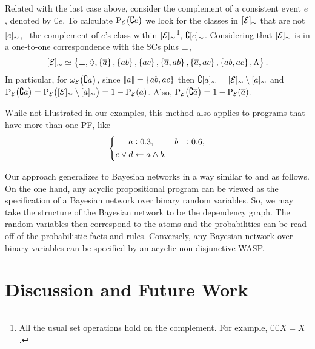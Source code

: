 \documentclass[x11names]{tlp}
\renewcommand{\cite}{\citep}
\begin{document}
\begin{example}
	Related with the last case above, consider the complement of a consistent event $e$, denoted by $\complement e$.
	To calculate $\prE\at{\complement e}$ we look for the classes in $[{{\mathcal{E}}}]_{\sim}$ that are not $[{e}]_{\sim}$, \ie~the complement of $e$'s class within $[{{\mathcal{E}}}]_{\sim}$\footnote{All the usual set operations hold on the complement.
	For example, $\complement\complement X = X$.}, $\complement[{e}]_{\sim}$.
	Considering that $[{{\mathcal{E}}}]_{\sim}$ is in a one-to-one correspondence with the \aclp{SC} plus $\bot$, 
	\begin{equation*}
		[{{\mathcal{E}}}]_{\sim} \simeq \set{
			\bot, \ensuremath{\Diamond}, \set{\ensuremath{\overline{a}}}
			, \set{ab}, \set{ac}, \set{\ensuremath{\overline{a}}, ab}
			, \set{\ensuremath{\overline{a}}, ac}, \set{ab, ac}, \ensuremath{\Lambda}}.
	\end{equation*}
	In particular, for $\wgtE\at{\complement a}$, since $\left\llbracket a \right\rrbracket = \set{ab, ac}$ then $\complement [{a}]_{\sim} = [{{\mathcal{E}}}]_{\sim} \setminus [{a}]_{\sim}$ and
	\(
	\prE\at{\complement a} =  \prE\at{\class{\EVENTSset} \setminus \class{a}} = 1 - \prE\at{a}
	\).
	Also, $\prE\at{\complement \co{a}} =  1 - \prE\at{\co{a}} $.
\end{example}

While not illustrated in our examples, this method also applies to programs that have more than one \acl{PF}, like
\begin{equation*}
	\left\{
	\begin{aligned}
		\weightfact{a & }{0.3},             %
		&&
		\weightfact{b & }{0.6},             %
		\\
		c \vee d    & \clause a \wedge b.
	\end{aligned}
	\right.
\end{equation*}

Our approach generalizes to Bayesian networks in a way similar to
\cite{cozman2020joy,raedt2016statistical} and
\cite{kiessling1992database,thone1997increased} as follows.
On the one hand, any acyclic propositional program can be viewed as the specification of a Bayesian network over binary random variables.
So, we may take the structure of the Bayesian network to be the dependency graph.
The random variables then correspond to the atoms and the probabilities can be read off of the probabilistic facts and rules.
Conversely, any Bayesian network over binary variables can be specified by an acyclic non-disjunctive \ac{WASP}.

\section{Discussion and Future Work}
\label{sec:discussion}
\end{document}
